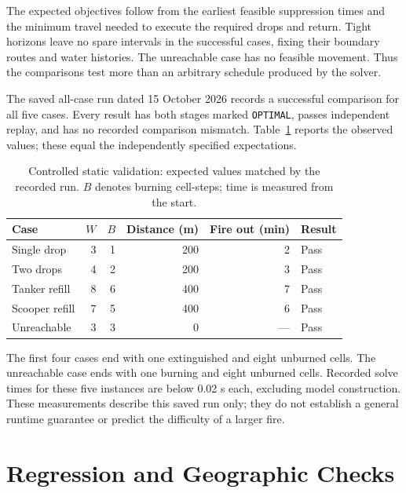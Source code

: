 The expected objectives follow from the earliest feasible suppression times and the minimum travel needed to execute the required drops and return. Tight horizons leave no spare intervals in the successful cases, fixing their boundary routes and water histories. The unreachable case has no feasible movement. Thus the comparisons test more than an arbitrary schedule produced by the solver.

The saved all-case run dated 15 October 2026 records a successful comparison for all five cases. Every result has both stages marked \texttt{OPTIMAL}, passes independent replay, and has no recorded comparison mismatch. Table~\ref{tab:controlled-results} reports the observed values; these equal the independently specified expectations.

\begin{table}[htbp]
\centering
\small
\caption{Controlled static validation: expected values matched by the recorded run. $B$ denotes burning cell-steps; time is measured from the start.}
\label{tab:controlled-results}
\begin{tabular}{lrrrrl}
\hline
Case & $W$ & $B$ & Distance (m) & Fire out (min) & Result \\
\hline
Single drop & 3 & 1 & 200 & 2 & Pass \\
Two drops & 4 & 2 & 200 & 3 & Pass \\
Tanker refill & 8 & 6 & 400 & 7 & Pass \\
Scooper refill & 7 & 5 & 400 & 6 & Pass \\
Unreachable & 3 & 3 & 0 & --- & Pass \\
\hline
\end{tabular}
\end{table}

The first four cases end with one extinguished and eight unburned cells. The unreachable case ends with one burning and eight unburned cells. Recorded solve times for these five instances are below 0.02 s each, excluding model construction. These measurements describe this saved run only; they do not establish a general runtime guarantee or predict the difficulty of a larger fire.

\section{Regression and Geographic Checks}
\label{sec:validation-regression}

